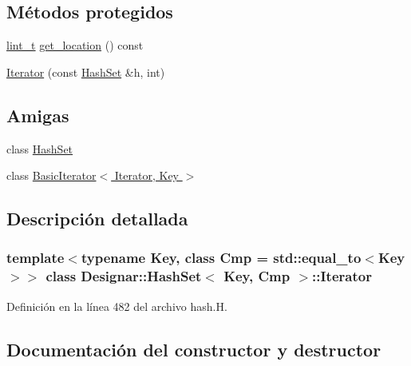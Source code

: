 \subsection*{Métodos protegidos}
\begin{DoxyCompactItemize}
\item 
\hyperlink{namespace_designar_a9d113d66a39e82b73727c72cd3a52f73}{lint\+\_\+t} \hyperlink{class_designar_1_1_hash_set_1_1_iterator_a8616bd592e20ebadab10de5c78a56eda}{get\+\_\+location} () const
\item 
\hyperlink{class_designar_1_1_hash_set_1_1_iterator_ae349523995246685946ec860e2705221}{Iterator} (const \hyperlink{class_designar_1_1_hash_set}{Hash\+Set} \&h, int)
\end{DoxyCompactItemize}
\subsection*{Amigas}
\begin{DoxyCompactItemize}
\item 
class \hyperlink{class_designar_1_1_hash_set_1_1_iterator_ac5220f06200dc3b0d55d050a940f17b9}{Hash\+Set}
\item 
class \hyperlink{class_designar_1_1_hash_set_1_1_iterator_a0b375a570add16b09037ce1773f0ddbb}{Basic\+Iterator$<$ Iterator, Key $>$}
\end{DoxyCompactItemize}


\subsection{Descripción detallada}
\subsubsection*{template$<$typename Key, class Cmp = std\+::equal\+\_\+to$<$\+Key$>$$>$\newline
class Designar\+::\+Hash\+Set$<$ Key, Cmp $>$\+::\+Iterator}



Definición en la línea 482 del archivo hash.\+H.



\subsection{Documentación del constructor y destructor}
\mbox{\label{class_designar_1_1_hash_set_1_1_iterator_ae349523995246685946ec860e2705221}} 
